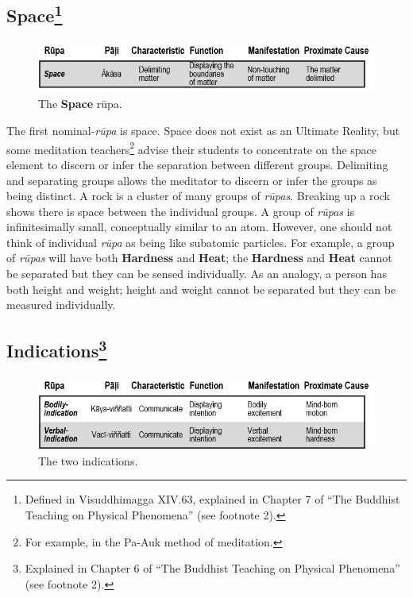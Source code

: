 \subsection*{Space\footnote{Defined in Visuddhimagga XIV.63, explained in Chapter 7 of “The Buddhist Teaching on Physical Phenomena” (see footnote 2).}}

\begin{figure}[h]
\centering
\includegraphics[width=0.8\linewidth]{./Diagrams/Space}
\caption{The \textbf{Space} rūpa.}
\label{fig:Space}
\end{figure}

The first nominal-\textit{rūpa} is space. Space does not exist as an Ultimate Reality, but some meditation teachers\footnote{For example, in the Pa-Auk method of meditation.} advise their students to concentrate on the space element to discern or infer the separation between different groups. Delimiting and separating groups allows the meditator to discern or infer the groups as being distinct. A rock is a cluster of many groups of \textit{rūpas}. Breaking up a rock shows there is space between the individual groups. A group of \textit{rūpas} is infinitesimally small, conceptually similar to an atom. However, one should not think of individual \textit{rūpa} as being like subatomic particles. For example, a group of \textit{rūpas} will have both \textbf{Hardness} and \textbf{Heat}; the \textbf{Hardness} and \textbf{Heat} cannot be separated but they can be sensed individually. As an analogy, a person has both height and weight; height and weight cannot be separated but they can be measured individually.

\subsection*{Indications\footnote{Explained in Chapter 6 of “The Buddhist Teaching on Physical Phenomena” (see footnote 2).}}

\begin{figure}[h]
\centering
\includegraphics[width=0.8\linewidth]{./Diagrams/Indications}
\caption{The two indications.}
\label{fig:Indications}
\end{figure}

